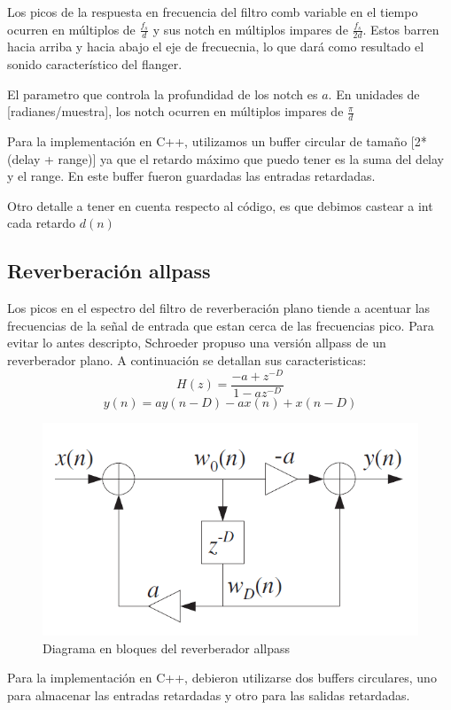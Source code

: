 \documentclass{report}
\begin{document}
Los picos de la respuesta en frecuencia del filtro comb variable en el tiempo ocurren en m\'{u}ltiplos de $\frac{f_s}{d}$ y sus notch en m\'{u}ltiplos impares de $\frac{f_s}{2d}$. Estos barren hacia arriba y hacia abajo el eje de frecuecnia, lo que dar\'{a} como resultado el sonido caracter\'{i}stico del flanger.

El parametro que controla la profundidad de los notch es $a$. En unidades de [radianes/muestra], los notch ocurren en m\'{u}ltiplos impares de $\frac{\pi}{d}$

Para la implementaci\'{o}n en C++, utilizamos un buffer circular de tamaño [2*(delay + range)] ya que el retardo m\'{a}ximo que puedo tener es la suma del delay y el range. En este buffer fueron guardadas las entradas retardadas. 

Otro detalle a tener en cuenta respecto al c\'{o}digo, es que debimos castear a int cada retardo $d(n)$ 

\subsection*{Reverberaci\'{o}n allpass}
Los picos en el espectro del filtro de reverberaci\'{o}n plano tiende a acentuar las frecuencias de la señal de entrada que estan cerca de las frecuencias pico. Para evitar lo antes descripto, Schroeder propuso una versi\'{o}n allpass de un reverberador plano. A continuaci\'{o}n se detallan sus caracteristicas: 
$$H(z)=\frac{-a+z^{-D}}{1-az^{-D}}$$
$$y(n)=ay(n-D)-ax(n)+x(n-D)$$
\begin{figure}[h]
  \centering
    \includegraphics[scale=0.75]{imagenes/diag_allpass.png}
  \caption{ Diagrama en bloques del reverberador allpass}
  \label{fig:SI}
\end{figure}

Para la implementaci\'{o}n en C++, debieron utilizarse dos buffers circulares, uno para almacenar las entradas retardadas y otro para las salidas retardadas. 
\end{document}
